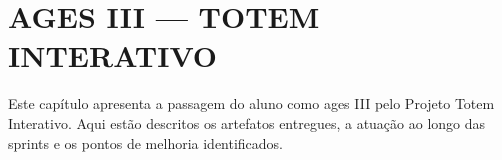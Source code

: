 \chapter[AGES III --- Totem Interativo]{AGES III --- TOTEM INTERATIVO}

Este capítulo apresenta a passagem do aluno como \ac{ages} III pelo Projeto Totem Interativo. Aqui estão descritos os artefatos entregues, a atuação ao longo das sprints e os pontos de melhoria identificados.




